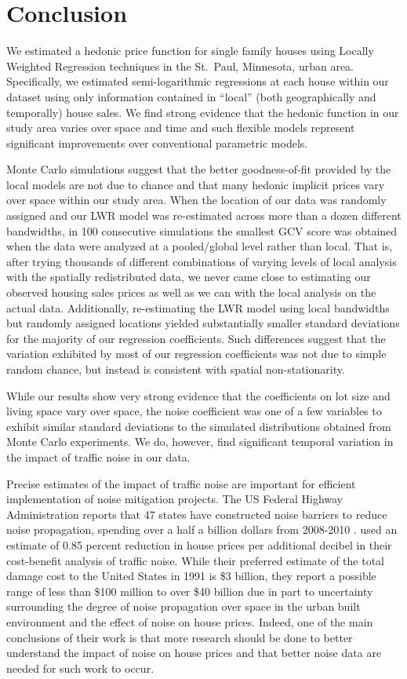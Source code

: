 \documentclass{article}\usepackage{graphicx, color}
\begin{document}
\section{Conclusion}
We estimated a hedonic price function for single family houses using Locally Weighted Regression techniques in the St.\ Paul, Minnesota, urban area. Specifically, we estimated semi-logarithmic regressions at each house within our dataset using only information contained in ``local'' (both geographically and temporally) house sales. We find strong evidence that the hedonic function in our study area varies over space and time and such flexible models represent significant improvements over conventional parametric models. 

Monte Carlo simulations suggest that the better goodness-of-fit provided by the local models are not due to chance and that many hedonic implicit prices vary over space within our study area. When the location of our data was randomly assigned and our LWR model was re-estimated across more than a dozen different bandwidths, in 100 consecutive simulations the smallest GCV score was obtained when the data were analyzed at a pooled/global level rather than local. That is, after trying thousands of different combinations of varying levels of local analysis with the spatially redistributed data, we never came close to estimating our observed housing sales prices as well as we can with the local analysis on the actual data. Additionally, re-estimating the LWR model using local bandwidths but randomly assigned locations yielded substantially smaller standard deviations for the majority of our regression coefficients. Such differences suggest that the variation exhibited by most of our regression coefficients was not due to simple random chance, but instead is consistent with spatial non-stationarity. 

While our results show very strong evidence that the coefficients on lot size and living space vary over space, the noise coefficient was one of a few variables to exhibit similar standard deviations to the simulated distributions obtained from Monte Carlo experiments. We do, however, find significant temporal variation in the impact of traffic noise in our data.

Precise estimates of the impact of traffic noise are important for efficient implementation of noise mitigation projects. The US Federal Highway Administration reports that 47 states have constructed noise barriers to reduce noise propagation, spending over a half a billion dollars from 2008-2010 . \citet{Delucchi1998} used an estimate of 0.85 percent reduction in house prices per additional decibel in their cost-benefit analysis of traffic noise. While their preferred estimate of the total damage cost to the United States in 1991 is \$3 billion, they report a possible range of less than \$100 million to over \$40 billion due in part to uncertainty surrounding the degree of noise propagation over space in the urban built environment and the effect of noise on house prices. Indeed, one of the main conclusions of their work is that more research should be done to better understand the impact of noise on house prices and that better noise data are needed for such work to occur. 
\end{document}
